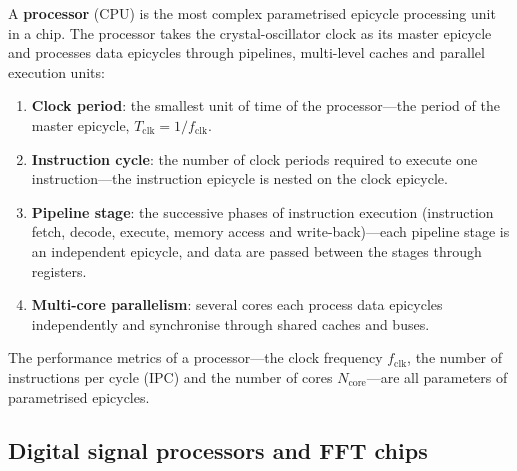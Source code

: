 \begin{definition}\label{def:cpu_epicycle}
A \textbf{processor} (CPU) is the most complex parametrised epicycle processing unit in a chip. The processor takes the crystal-oscillator clock as its master epicycle and processes data epicycles through pipelines, multi-level caches and parallel execution units:
\begin{enumerate}[label=(\roman*)]
    \item \textbf{Clock period}: the smallest unit of time of the processor---the period of the master epicycle, $T_{\text{clk}} = 1/f_{\text{clk}}$.
    \item \textbf{Instruction cycle}: the number of clock periods required to execute one instruction---the instruction epicycle is nested on the clock epicycle.
    \item \textbf{Pipeline stage}: the successive phases of instruction execution (instruction fetch, decode, execute, memory access and write-back)---each pipeline stage is an independent epicycle, and data are passed between the stages through registers.
    \item \textbf{Multi-core parallelism}: several cores each process data epicycles independently and synchronise through shared caches and buses.
\end{enumerate}
The performance metrics of a processor---the clock frequency $f_{\text{clk}}$, the number of instructions per cycle (IPC) and the number of cores $N_{\text{core}}$---are all parameters of parametrised epicycles.
\end{definition}

\subsection{Digital signal processors and FFT chips}

